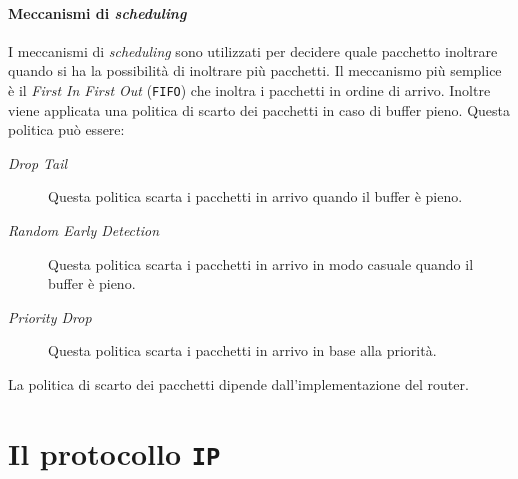         \paragraph{Meccanismi di \textit{scheduling}}
            I meccanismi di \textit{scheduling} sono utilizzati per decidere quale pacchetto inoltrare quando si ha la possibilità di inoltrare più pacchetti. Il meccanismo più semplice è il \textit{First In First Out} (\texttt{FIFO}) che inoltra i pacchetti in ordine di arrivo. Inoltre viene applicata una politica di scarto dei pacchetti in caso di buffer pieno. Questa politica può essere: \begin{description}
                \item[\textit{Drop Tail}] Questa politica scarta i pacchetti in arrivo quando il buffer è pieno.
                \item[\textit{Random Early Detection}] Questa politica scarta i pacchetti in arrivo in modo casuale quando il buffer è pieno.
                \item[\textit{Priority Drop}] Questa politica scarta i pacchetti in arrivo in base alla priorità.
            \end{description}
            La politica di scarto dei pacchetti dipende dall'implementazione del router.
\section{Il protocollo \texttt{IP}}
